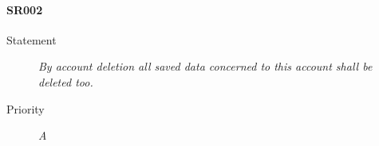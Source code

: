 \paragraph{SR002}
  \begin{description}
  \item [Statement] 
    \textit{ By account deletion all saved data concerned to this account shall be deleted too.}
  \item [Priority] \textit{A}
\end{description}